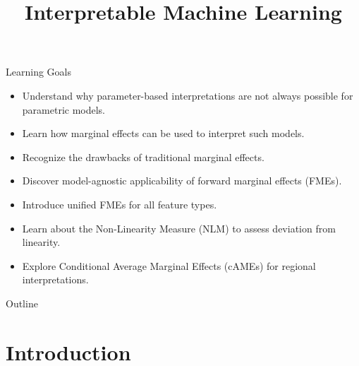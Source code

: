 \documentclass[11pt,compress,t,notes=noshow, aspectratio=169, xcolor=table]{beamer}
\title{Interpretable Machine Learning}
\date{}
\begin{document}


\begin{frame}{Learning Goals}
\begin{itemize}
\item Understand why parameter-based interpretations are not always possible for parametric models.
\item Learn how marginal effects can be used to interpret such models.
\item Recognize the drawbacks of traditional marginal effects.
\item Discover model-agnostic applicability of forward marginal effects (FMEs).
\item Introduce unified FMEs for all feature types.
\item Learn about the Non-Linearity Measure (NLM) to assess deviation from linearity.
\item Explore Conditional Average Marginal Effects (cAMEs) for regional interpretations.
\end{itemize}
\end{frame}

\begin{frame}{Outline}
\tableofcontents
\end{frame}

\section{Introduction}
\end{document}
